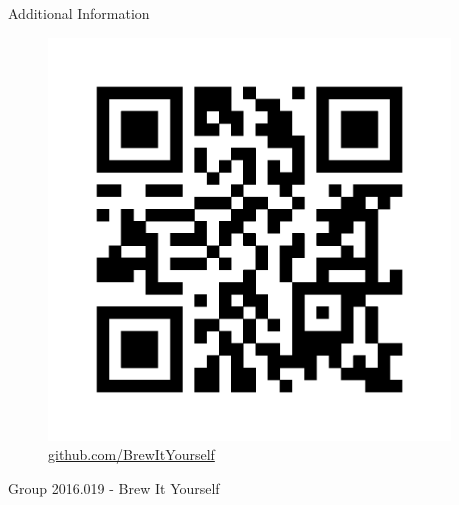 \documentclass[final]{beamer}
\newlength{\sepwid}
\newlength{\onecolwid}
\begin{document}
\begin{frame}[t]
\begin{columns}[t]
\begin{column}{\onecolwid}
\begin{alertblock}{Additional Information}

\begin{figure}
\includegraphics[width=0.4\linewidth]{qr-biy.png}
\caption{\href{https://github.com/BrewItYourself}{github.com/BrewItYourself}}
\end{figure}

\end{alertblock}

\begin{flushright}
Group 2016.019 - Brew It Yourself
\end{flushright}


\end{column} %

\begin{column}{\sepwid}\end{column} %

\end{columns} %

\end{frame} %
\end{document}
